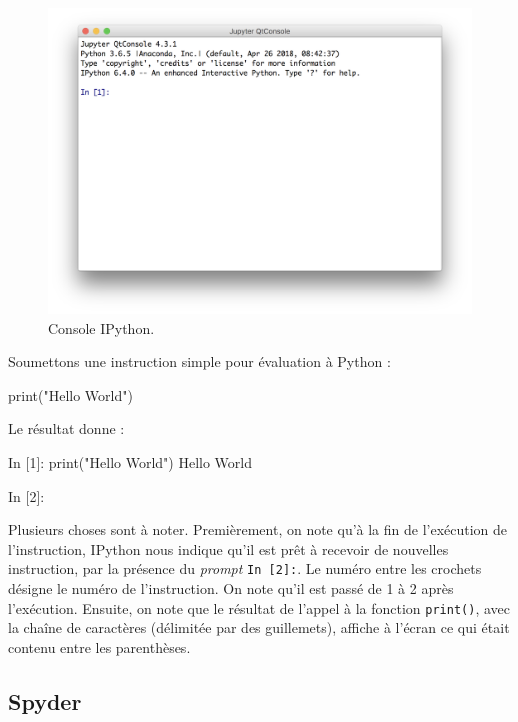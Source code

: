 \documentclass[
  12pt,
]{book}
\newenvironment{Shaded}{\begin{snugshade}}{\end{snugshade}}
\newcommand{\BuiltInTok}[1]{#1}
\newcommand{\NormalTok}[1]{#1}
\newcommand{\StringTok}[1]{\textcolor[rgb]{0.31,0.60,0.02}{#1}}
\numberwithin{equation}{section}
\numberwithin{countremarque}{section}
\begin{document}
\begin{figure}[H]

{\centering \includegraphics[width=0.7\linewidth]{figs/ipython} 

}

\caption{Console IPython.}\label{fig:unnamed-chunk-5}
\end{figure}

Soumettons une instruction simple pour évaluation à Python :

\begin{Shaded}
\begin{Highlighting}[]
\BuiltInTok{print}\NormalTok{(}\StringTok{"Hello World"}\NormalTok{)}
\end{Highlighting}
\end{Shaded}

Le résultat donne :

\begin{Shaded}
\begin{Highlighting}[]
\NormalTok{In [1]: print("Hello World")}
\NormalTok{Hello World}

\NormalTok{In [2]:}
\end{Highlighting}
\end{Shaded}

Plusieurs choses sont à noter. Premièrement, on note qu'à la fin de l'exécution de l'instruction, IPython nous indique qu'il est prêt à recevoir de nouvelles instruction, par la présence du \emph{prompt} \texttt{In\ {[}2{]}:}. Le numéro entre les crochets désigne le numéro de l'instruction. On note qu'il est passé de 1 à 2 après l'exécution. Ensuite, on note que le résultat de l'appel à la fonction \texttt{print()}, avec la chaîne de caractères (délimitée par des guillemets), affiche à l'écran ce qui était contenu entre les parenthèses.

\subsection{Spyder}\label{spyder}
\end{document}
